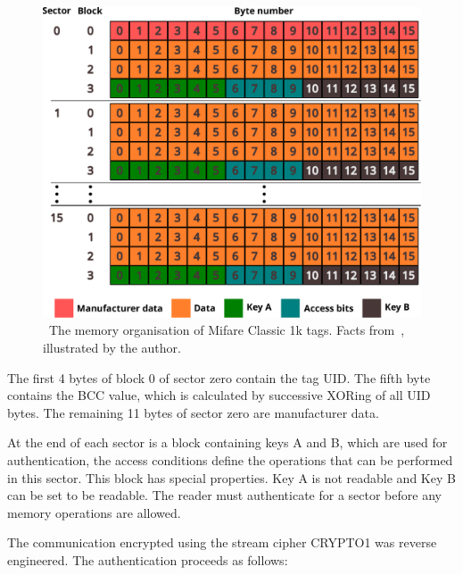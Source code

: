 \begin{figure}[ht]
  \centering
  \includegraphics[width=12cm]{text/classic1k_data.pdf}
  \caption[The memory organisation of Mifare Classic 1k tags.]{~The memory organisation of Mifare Classic 1k tags. Facts from~\cite{classic1kdatasheet}, illustrated by the author.}
  \label{fig:classsic1kmemory}
\end{figure}

The first 4 bytes of block 0 of sector zero contain the tag UID. The fifth byte contains the BCC value, which is calculated by successive XORing of all UID bytes. The remaining 11 bytes of sector zero are manufacturer data.~\cite{gans2008practical}

At the end of each sector is a block containing keys A and B, which are used for authentication, the access conditions define the operations that can be performed in this sector. This block has special properties. Key A is not readable and Key B can be set to be readable. The reader must authenticate for a sector before any memory operations are allowed.~\cite{gans2008practical}

The communication encrypted using the stream cipher CRYPTO1 was reverse engineered. The authentication proceeds as follows:

